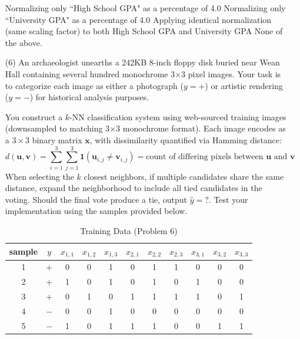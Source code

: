 \documentclass[11pt,addpoints,answers]{exam}
\newcommand{\xv}{\mathbf{x}}
\newcommand{\vv}{\mathbf{v}}
\newcommand{\uv}{\mathbf{u}}
\newcounter{subq}        %
\renewcommand{\thesubq}{(\alph{subq})}  %
\newenvironment{subquestions}{
	\setcounter{subq}{0}%
	\begin{enumerate}[
		label=\thesubq,
		leftmargin=*,
		align=left,
		itemsep=6pt
		]
	}{
	\end{enumerate}
}
\begin{document}
\begin{enumerate}[label=\alph*), itemsep=10pt]
\begin{subquestions}
			\begin{checkboxes}
				\checkboxchar{$\Box$} \checkedchar{$\blacksquare$}
				\CorrectChoice Normalizing only ``High School GPA" as a percentage of 4.0
				\CorrectChoice Normalizing only ``University GPA" as a percentage of 4.0
				\choice Applying identical normalization (same scaling factor) to both High School GPA and University GPA
				\choice None of the above.
			\end{checkboxes}
		\end{subquestions}
		
		\clearpage
		
		\item[(6)] An archaeologist unearths a 242KB 8-inch floppy disk buried near Wean Hall containing several hundred monochrome 3×3 pixel images. Your task is to categorize each image as either a photograph ($y=+$) or artistic rendering ($y=-$) for historical analysis purposes. 
		
		You construct a $k$-NN classification system using web-sourced training images (downsampled to matching 3×3 monochrome format). Each image encodes as a $3 \times 3$ binary matrix $\xv$, with dissimilarity quantified via Hamming distance: 
		$$d(\uv, \mathbf{v}) = \sum_{i=1}^3 \sum_{j=1}^3 \mathbf{1}(\uv_{i,j} \neq \vv_{i,j}) = \text{count of differing pixels between } \uv \text{ and } \vv$$
		When selecting the $k$ closest neighbors, if multiple candidates share the same distance, expand the neighborhood to include all tied candidates in the voting. Should the final vote produce a tie, output $\hat{y}=?$. 
		Test your implementation using the samples provided below.
		
		\begin{table}[H]
			\centering
			\begin{tabular}{ccccccccccc}
				\toprule
				sample & $y$ & $x_{1,1}$ & $x_{1,2}$ & $x_{1,3}$ & $x_{2,1}$ & $x_{2,2}$ & $x_{2,3}$ & $x_{3,1}$ & $x_{3,2}$ & $x_{3,3}$  \\
				\midrule
				1 & $+$ & 0 & 0 & 1 & 0 & 1 & 1 & 0 & 0 & 0 \\
				2 & $+$ & 1 & 0 & 1 & 0 & 1 & 0 & 1 & 0 & 0 \\
				3 & $+$ & 0 & 1 & 0 & 1 & 1 & 1 & 1 & 0 & 1 \\
				4 & $-$ & 0 & 0 & 1 & 0 & 0 & 0 & 0 & 0 & 0 \\
				5 & $-$ & 1 & 0 & 1 & 1 & 1 & 0 & 0 & 1 & 1 \\
				\bottomrule
			\end{tabular}
			\caption{Training Data (Problem 6)} \label{tab:knn6_train_img}  %
		\end{table}
		

\end{enumerate}
\end{document}
